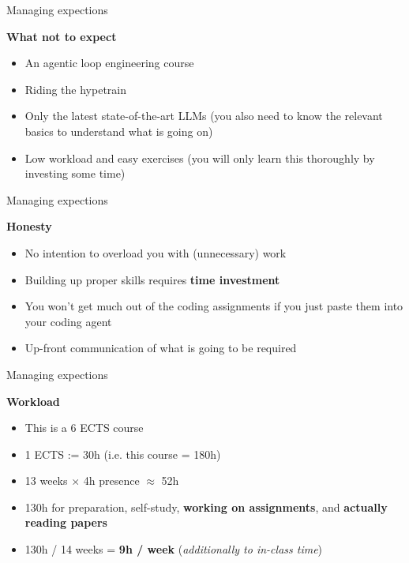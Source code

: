 \documentclass[11pt,compress,t,notes=noshow, xcolor=table]{beamer}
\begin{document}

\begin{frame}{Managing expections}

\vfill

\textbf{What not to expect}

	\begin{itemize}
		\item An agentic loop engineering course
		\item Riding the hypetrain
		\item Only the latest state-of-the-art LLMs (you also need to know the relevant basics to understand what is going on)
		\item Low workload and easy exercises (you will only learn this thoroughly by investing some time)
	\end{itemize}

\vfill

\end{frame}


\begin{frame}{Managing expections}

\vfill

\textbf{Honesty}

	\begin{itemize}
		\item No intention to overload you with (unnecessary) work
		\item Building up proper skills requires \textbf{time investment}
		\item You won't get much out of the coding assignments if you just paste them into your coding agent 
		\item Up-front communication of what is going to be required
	\end{itemize}
\vfill

\end{frame}


\begin{frame}{Managing expections}

\vfill

\textbf{Workload}

	\begin{itemize}
		\item This is a 6 ECTS course
		\item 1 ECTS := 30h (i.e. this course = 180h)
		\item 13 weeks $\times$ 4h presence $\approx$ 52h
		\item 130h for preparation, self-study, \textbf{working on assignments}, and \textbf{actually reading papers}
		\item 130h / 14 weeks = \textbf{9h / week} (\textit{additionally to in-class time})
	\end{itemize}


\vfill

\end{frame}
\end{document}
